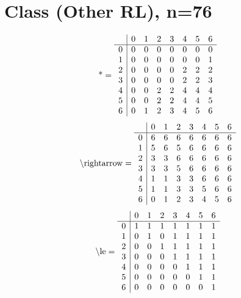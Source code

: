 \documentclass[11pt]{article}
\begin{document}
\section{Class (Other RL), n=76}
\[\text{*} = 
\begin{array}{r | r r r r r r r}
 & 0 & 1 & 2 & 3 & 4 & 5 & 6 \\ \hline
0 & 0 & 0 & 0 & 0 & 0 & 0 & 0 \\
1 & 0 & 0 & 0 & 0 & 0 & 0 & 1 \\
2 & 0 & 0 & 0 & 0 & 2 & 2 & 2 \\
3 & 0 & 0 & 0 & 0 & 2 & 2 & 3 \\
4 & 0 & 0 & 2 & 2 & 4 & 4 & 4 \\
5 & 0 & 0 & 2 & 2 & 4 & 4 & 5 \\
6 & 0 & 1 & 2 & 3 & 4 & 5 & 6 \\
\end{array}
\]
\[\text{\textbackslash rightarrow} = 
\begin{array}{r | r r r r r r r}
 & 0 & 1 & 2 & 3 & 4 & 5 & 6 \\ \hline
0 & 6 & 6 & 6 & 6 & 6 & 6 & 6 \\
1 & 5 & 6 & 5 & 6 & 6 & 6 & 6 \\
2 & 3 & 3 & 6 & 6 & 6 & 6 & 6 \\
3 & 3 & 3 & 5 & 6 & 6 & 6 & 6 \\
4 & 1 & 1 & 3 & 3 & 6 & 6 & 6 \\
5 & 1 & 1 & 3 & 3 & 5 & 6 & 6 \\
6 & 0 & 1 & 2 & 3 & 4 & 5 & 6 \\
\end{array}
\]
\[\text{\textbackslash le} = 
\begin{array}{r | r r r r r r r}
 & 0 & 1 & 2 & 3 & 4 & 5 & 6 \\ \hline
0 & 1 & 1 & 1 & 1 & 1 & 1 & 1 \\
1 & 0 & 1 & 0 & 1 & 1 & 1 & 1 \\
2 & 0 & 0 & 1 & 1 & 1 & 1 & 1 \\
3 & 0 & 0 & 0 & 1 & 1 & 1 & 1 \\
4 & 0 & 0 & 0 & 0 & 1 & 1 & 1 \\
5 & 0 & 0 & 0 & 0 & 0 & 1 & 1 \\
6 & 0 & 0 & 0 & 0 & 0 & 0 & 1 \\
\end{array}
\]
\end{document}
